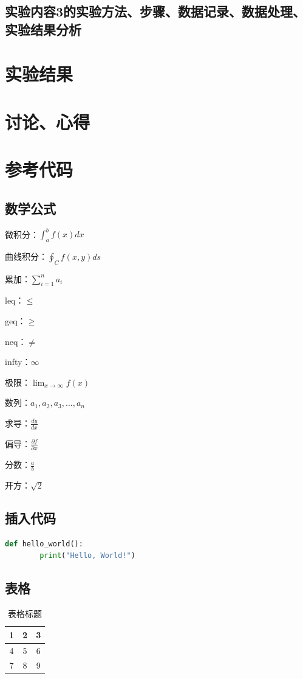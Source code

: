 \documentclass[UTF8]{ctexart}
\begin{document}
\subsection{实验内容3的实验方法、步骤、数据记录、数据处理、实验结果分析}

\section{实验结果}

\section{讨论、心得}


\section{参考代码}

\subsection{数学公式}

微积分：$\int_{a}^{b} f(x)dx$ \par
曲线积分：$\oint_{C} f(x,y)ds$ \par
累加：$\sum_{i=1}^{n} a_i$ \par
leq：$\leq$ \par
geq：$\geq$ \par
neq：$\neq$ \par
infty：$\infty$ \par
极限：$\lim_{x \to \infty} f(x)$ \par
数列：$a_1, a_2, a_3, \ldots, a_n$ \par
求导：$\frac{dy}{dx}$ \par
偏导：$\frac{\partial f}{\partial x}$ \par
分数：$\frac{a}{b}$ \par
开方：$\sqrt{2}$ \par


\subsection{插入代码}

\begin{lstlisting}[language=Python]
    def hello_world():
        print("Hello, World!")
\end{lstlisting}

\subsection{表格}
\begin{table}[htbp]
    \centering
    \begin{tabular}{|c|c|c|}
        \hline
        1 & 2 & 3 \\
        \hline
        4 & 5 & 6 \\
        \hline
        7 & 8 & 9 \\
        \hline
    \end{tabular}
    \caption{表格标题}
    \label{tab:1}
\end{table}
\end{document}
